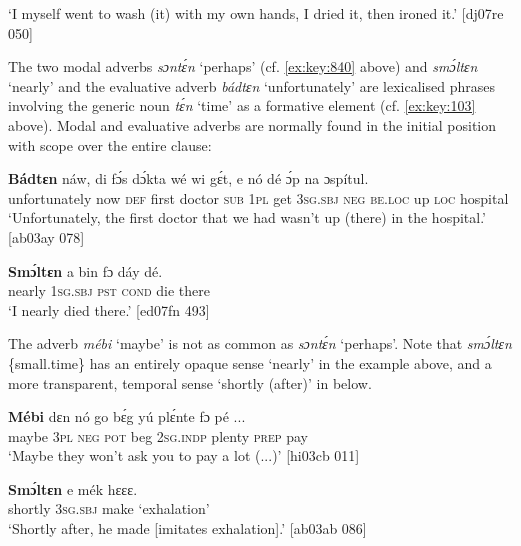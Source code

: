 \glt ‘I myself went to wash (it) with my own hands, I dried it, then ironed it.’ [dj07re 050]
\z

The two modal adverbs \textit{sɔntɛ́n} ‘perhaps’ (cf. \ref{ex:key:840} above) and \textit{smɔ́ltɛn} ‘nearly’  and the evaluative adverb \textit{bádtɛn} ‘unfortunately’  are lexicalised phrases involving the generic noun \textit{tɛ́n} ‘time’ as a formative element (cf. \ref{ex:key:103} above). Modal and evaluative adverbs are normally found in the initial position with scope over the entire clause: 


\ea%
    \label{ex:key:847}
    \gll \textbf{Bádtɛn}      náw,  di  fɔ́s  dɔ́kta  wé  wi  gɛ́t, 
e    nó  dé   ɔ́p  na  ɔspítul.\\
unfortunately  now    \textsc{def}  first  doctor  \textsc{sub}  \textsc{1pl}  get
\textsc{3sg.sbj}  \textsc{neg}  \textsc{be.loc} up  \textsc{loc}  hospital\\

\glt ‘Unfortunately, the first doctor that we had wasn’t up 
(there) in the hospital.’ [ab03ay 078]
\z


\ea%
    \label{ex:key:848}
    \gll \textbf{Smɔ́ltɛn}   a    bin  fɔ    dáy  dé.\\
nearly    \textsc{1sg.sbj}  \textsc{pst}  \textsc{cond}    die  there\\

\glt ‘I nearly died there.’  [ed07fn 493]
\z

The adverb \textit{mébi} ‘maybe’  is not as common as \textit{sɔntɛ́n} ‘perhaps’. Note that \textit{smɔ́ltɛn} \{small.time\} has an entirely opaque sense ‘nearly’ in the example above, and a more transparent, temporal sense ‘shortly (after)’ in  below.


\ea%
    \label{ex:key:849}
    \gll \textbf{Mébi}  dɛn  nó  go  bɛ́g  yú    plɛ́nte  fɔ  pé  \op...\cp{}\\
maybe  \textsc{3pl}  \textsc{neg}  \textsc{pot}  beg  \textsc{2sg.indp}  plenty  \textsc{prep}  pay\\

\glt ‘Maybe they won’t ask you to pay a lot (...)’ [hi03cb 011]
\z


\ea%
    \label{ex:key:850}
    \gll \textbf{Smɔ́ltɛn}   e    mék    hɛɛɛ.\\
shortly    \textsc{3sg.sbj}  make  ‘exhalation’\\

\glt ‘Shortly after, he made [imitates exhalation].’ [ab03ab 086]
\z

